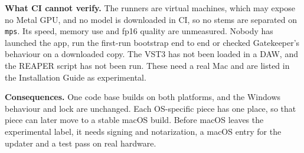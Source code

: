 \textbf{What CI cannot verify.} The runners are virtual machines, which may
expose no Metal GPU, and no model is downloaded in CI, so no stems are
separated on \texttt{mps}. Its speed, memory use and fp16 quality are
unmeasured. Nobody has launched the app, run the first-run bootstrap
end to end or checked Gatekeeper's behaviour on a downloaded copy. The VST3
has not been loaded in a DAW, and the REAPER script has not been run. These
need a real Mac and are listed in the Installation Guide as experimental.

\textbf{Consequences.} One code base builds on both platforms, and the
Windows behaviour and lock are unchanged. Each OS-specific piece has one
place, so that piece can later move to a stable macOS build. Before macOS
leaves the experimental label, it needs
signing and notarization, a macOS entry for the updater and a test pass on
real hardware.
